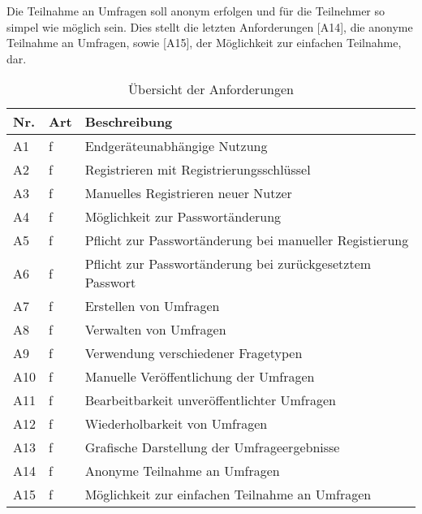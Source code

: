 Die Teilnahme an Umfragen soll anonym erfolgen und für die Teilnehmer so simpel wie möglich sein.
Dies stellt die letzten Anforderungen [A14], die anonyme Teilnahme an Umfragen, sowie [A15], der Möglichkeit zur einfachen Teilnahme, dar.

\begin{table}
  \setlength\extrarowheight{3pt}
\centering
  \begin{tabular}{|C{1cm}|C{1cm}|L{12cm}|}
    \hline
    \textbf{Nr.} & \textbf{Art} & \textbf{Beschreibung} \\
    \hline
    {\label{Anf:A1}A1} & f & Endgeräteunabhängige Nutzung \\
    \hline
    {\label{Anf:A2}A2} & f & Registrieren mit Registrierungsschlüssel \\
    \hline
    {\label{Anf:A3}A3} & f & Manuelles Registrieren neuer Nutzer \\
    \hline
    {\label{Anf:A4}A4} & f & Möglichkeit zur Passwortänderung \\
    \hline
    {\label{Anf:A5}A5} & f & Pflicht zur Passwortänderung bei manueller Registierung \\
    \hline
    {\label{Anf:A6}A6} & f & Pflicht zur Passwortänderung bei zurückgesetztem Passwort \\
    \hline
    {\label{Anf:A7}A7} & f & Erstellen von Umfragen \\
    \hline
    {\label{Anf:A8}A8} & f & Verwalten von Umfragen \\
    \hline
    {\label{Anf:A9}A9} & f & Verwendung verschiedener Fragetypen \\
    \hline
    {\label{Anf:A10}A10} & f & Manuelle Veröffentlichung der Umfragen \\
    \hline
    {\label{Anf:A11}A11} & f & Bearbeitbarkeit unveröffentlichter Umfragen \\
    \hline
    {\label{Anf:A12}A12} & f & Wiederholbarkeit von Umfragen \\
    \hline
    {\label{Anf:A13}A13} & f & Grafische Darstellung der Umfrageergebnisse \\
    \hline
    {\label{Anf:A14}A14} & f & Anonyme Teilnahme an Umfragen \\
    \hline
    {\label{Anf:A15}A15} & f & Möglichkeit zur einfachen Teilnahme an Umfragen \\
    \hline
  \end{tabular}
  \caption{Übersicht der Anforderungen}
  \label{tab:Anforderungen}
\end{table}
